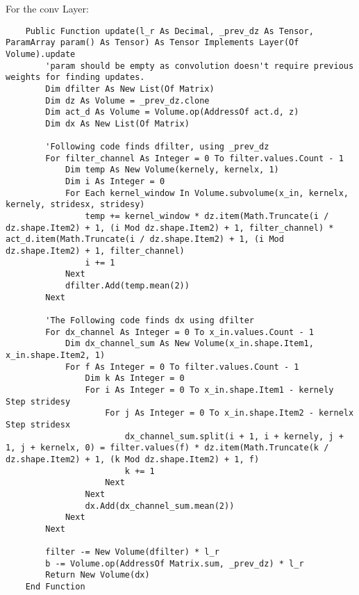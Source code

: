 For the conv Layer:
\begin{verbatim}
    Public Function update(l_r As Decimal, _prev_dz As Tensor, ParamArray param() As Tensor) As Tensor Implements Layer(Of Volume).update
        'param should be empty as convolution doesn't require previous weights for finding updates.
        Dim dfilter As New List(Of Matrix)
        Dim dz As Volume = _prev_dz.clone
        Dim act_d As Volume = Volume.op(AddressOf act.d, z)
        Dim dx As New List(Of Matrix)

        'Following code finds dfilter, using _prev_dz
        For filter_channel As Integer = 0 To filter.values.Count - 1
            Dim temp As New Volume(kernely, kernelx, 1)
            Dim i As Integer = 0
            For Each kernel_window In Volume.subvolume(x_in, kernelx, kernely, stridesx, stridesy)
                temp += kernel_window * dz.item(Math.Truncate(i / dz.shape.Item2) + 1, (i Mod dz.shape.Item2) + 1, filter_channel) * act_d.item(Math.Truncate(i / dz.shape.Item2) + 1, (i Mod dz.shape.Item2) + 1, filter_channel)
                i += 1
            Next
            dfilter.Add(temp.mean(2))
        Next

        'The Following code finds dx using dfilter
        For dx_channel As Integer = 0 To x_in.values.Count - 1
            Dim dx_channel_sum As New Volume(x_in.shape.Item1, x_in.shape.Item2, 1)
            For f As Integer = 0 To filter.values.Count - 1
                Dim k As Integer = 0
                For i As Integer = 0 To x_in.shape.Item1 - kernely Step stridesy
                    For j As Integer = 0 To x_in.shape.Item2 - kernelx Step stridesx
                        dx_channel_sum.split(i + 1, i + kernely, j + 1, j + kernelx, 0) = filter.values(f) * dz.item(Math.Truncate(k / dz.shape.Item2) + 1, (k Mod dz.shape.Item2) + 1, f)
                        k += 1
                    Next
                Next
                dx.Add(dx_channel_sum.mean(2))
            Next
        Next

        filter -= New Volume(dfilter) * l_r
        b -= Volume.op(AddressOf Matrix.sum, _prev_dz) * l_r
        Return New Volume(dx)
    End Function
\end{verbatim}